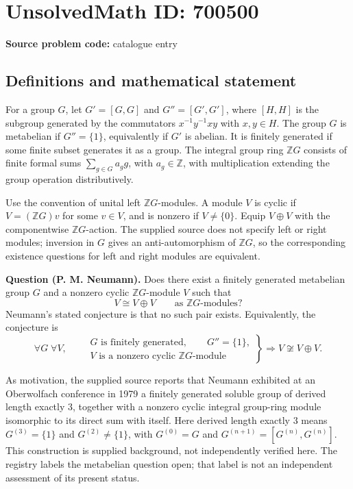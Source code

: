 \documentclass[11pt]{article}
\newcommand{\Z}{\mathbb{Z}}
\begin{document}
\section*{UnsolvedMath ID: 700500}
\textbf{Source problem code:} catalogue entry
\subsection{Definitions and mathematical statement}
For a group \(G\), let \(G'=[G,G]\) and \(G''=[G',G']\), where \([H,H]\) is the subgroup generated by the commutators \(x^{-1}y^{-1}xy\) with \(x,y\in H\). The group \(G\) is metabelian if \(G''=\{1\}\), equivalently if \(G'\) is abelian. It is finitely generated if some finite subset generates it as a group. The integral group ring \(\Z G\) consists of finite formal sums \(\sum_{g\in G}a_g g\), with \(a_g\in\Z\), with multiplication extending the group operation distributively.

Use the convention of unital left \(\Z G\)-modules. A module \(V\) is cyclic if \(V=(\Z G)v\) for some \(v\in V\), and is nonzero if \(V\ne\{0\}\). Equip \(V\oplus V\) with the componentwise \(\Z G\)-action. The supplied source does not specify left or right modules; inversion in \(G\) gives an anti-automorphism of \(\Z G\), so the corresponding existence questions for left and right modules are equivalent.

\textbf{Question (P. M. Neumann).} Does there exist a finitely generated metabelian group \(G\) and a nonzero cyclic \(\Z G\)-module \(V\) such that
\[
V\cong V\oplus V
\qquad\text{as }\Z G\text{-modules}?
\]
Neumann's stated conjecture is that no such pair exists. Equivalently, the conjecture is
\[
\forall G\;\forall V,\qquad
\left.
\begin{gathered}
G\text{ is finitely generated},\qquad G''=\{1\},\\
V\text{ is a nonzero cyclic }\Z G\text{-module}
\end{gathered}
\right\}
\Longrightarrow V\not\cong V\oplus V.
\]

As motivation, the supplied source reports that Neumann exhibited at an Oberwolfach conference in 1979 a finitely generated soluble group of derived length exactly \(3\), together with a nonzero cyclic integral group-ring module isomorphic to its direct sum with itself. Here derived length exactly \(3\) means \(G^{(3)}=\{1\}\) and \(G^{(2)}\ne\{1\}\), with \(G^{(0)}=G\) and \(G^{(n+1)}=[G^{(n)},G^{(n)}]\). This construction is supplied background, not independently verified here. The registry labels the metabelian question open; that label is not an independent assessment of its present status.
\end{document}
